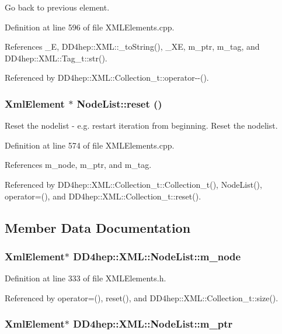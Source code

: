 Go back to previous element. 

Definition at line 596 of file XMLElements.cpp.

References \_\-E, DD4hep::XML::\_\-toString(), \_\-XE, m\_\-ptr, m\_\-tag, and DD4hep::XML::Tag\_\-t::str().

Referenced by DD4hep::XML::Collection\_\-t::operator-\/-\/().\hypertarget{class_d_d4hep_1_1_x_m_l_1_1_node_list_ac1d472d2a7418c4dadf545044143901d}{
\subsubsection[{reset}]{\setlength{\rightskip}{0pt plus 5cm}XmlElement $\ast$ NodeList::reset ()}}
\label{class_d_d4hep_1_1_x_m_l_1_1_node_list_ac1d472d2a7418c4dadf545044143901d}


Reset the nodelist -\/ e.g. restart iteration from beginning. Reset the nodelist. 

Definition at line 574 of file XMLElements.cpp.

References m\_\-node, m\_\-ptr, and m\_\-tag.

Referenced by DD4hep::XML::Collection\_\-t::Collection\_\-t(), NodeList(), operator=(), and DD4hep::XML::Collection\_\-t::reset().

\subsection{Member Data Documentation}
\hypertarget{class_d_d4hep_1_1_x_m_l_1_1_node_list_a14d433901c24fd64952a21eb7700ec42}{
\subsubsection[{m\_\-node}]{\setlength{\rightskip}{0pt plus 5cm}XmlElement$\ast$ {\bf DD4hep::XML::NodeList::m\_\-node}}}
\label{class_d_d4hep_1_1_x_m_l_1_1_node_list_a14d433901c24fd64952a21eb7700ec42}


Definition at line 333 of file XMLElements.h.

Referenced by operator=(), reset(), and DD4hep::XML::Collection\_\-t::size().\hypertarget{class_d_d4hep_1_1_x_m_l_1_1_node_list_ac57599e511cd4e3d6d8643eef39839c5}{
\subsubsection[{m\_\-ptr}]{\setlength{\rightskip}{0pt plus 5cm}XmlElement$\ast$ {\bf DD4hep::XML::NodeList::m\_\-ptr}}}
\label{class_d_d4hep_1_1_x_m_l_1_1_node_list_ac57599e511cd4e3d6d8643eef39839c5}


